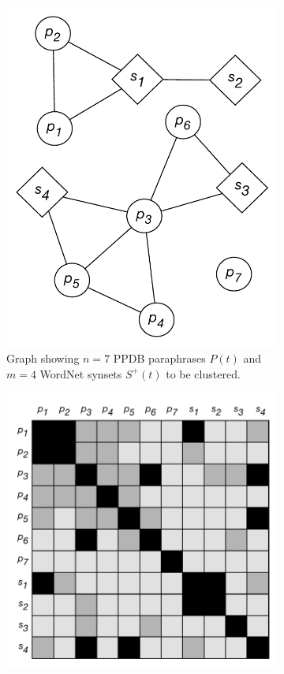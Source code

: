 \documentclass[11pt]{article}
\begin{document}
\begin{figure}[th]
	\begin{subfigure}[t]{0.25\textwidth}
		\includegraphics[width=\textwidth]{images/pp_syn_graph.pdf}
		\caption{Graph showing $n=7$ PPDB paraphrases $P(t)$ and $m=4$ WordNet synsets $S^+(t)$ to be clustered.}
		\label{fig:ppsyngraph}
	\end{subfigure}
	\hfill%
	\begin{subfigure}[t]{0.36\textwidth}
		\includegraphics[width=\textwidth]{images/pp_syn_mat_all.pdf}

\end{subfigure}
\end{figure}
\end{document}
